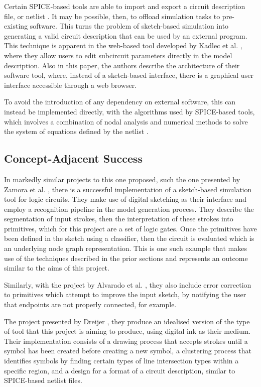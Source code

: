 \documentclass[11pt]{article}
\begin{document}
Certain \gls{SPICE}-based tools are able to import and export a circuit description file, or netlist \cite{web:cadence-pspice}. It may be possible,
then, to offload simulation tasks to pre-existing software. This turns the problem of sketch-based simulation into generating a
valid circuit description that can be used by an external program. This technique is apparent in the web-based
tool developed by Kadlec et al. \cite{5432817}, where they allow users to edit subcircuit parameters directly in the model description.
Also in this paper, the authors describe the architecture of their software tool, where, instead of a sketch-based interface, there is a
graphical user interface accessible through a web browser.

To avoid the introduction of any dependency on external software, this can instead be implemented directly, with the algorithms used
by \gls{SPICE}-based tools, which involves a combination of nodal analysis and numerical methods to solve the system of equations defined
by the netlist \cite{web:spice-algorithm,book:circuit-simulation}.

\subsection{Concept-Adjacent Success}
\label{subsec:Concept-Adjacent Success}

In markedly similar projects to this one proposed, such the one presented by Zamora et al. \cite{20090001}, there is a successful implementation
of a sketch-based simulation tool for logic circuits. They make use of digital sketching as their interface and employ a recognition
pipeline in the model generation process. They describe the segmentation of input strokes, then the interpretation of these strokes
into primitives, which for this project are a set of logic gates. Once the primitives have been defined in the sketch using a classifier,
then the circuit is evaluated which is an underlying node graph representation. This is one such example that makes use of the techniques
described in the prior sections and represents an outcome similar to the aims of this project.

Similarly, with the project by Alvarado et al. \cite{9155937}, they also include error correction to primitives which attempt to improve
the input sketch, by notifying the user that endpoints are not properly connected, for example.

The project presented by Dreijer \cite{dreijer}, they produce an idealised version of the type of tool that this project
is aiming to produce, using digital ink as their medium. Their implementation consists of a drawing process that accepts strokes
until a symbol has been created before creating a new symbol, a clustering process that identifies symbols by finding certain types
of line intersection types within a specific region, and a design for a format of a circuit description, similar to \gls{SPICE}-based
netlist files.
\end{document}
